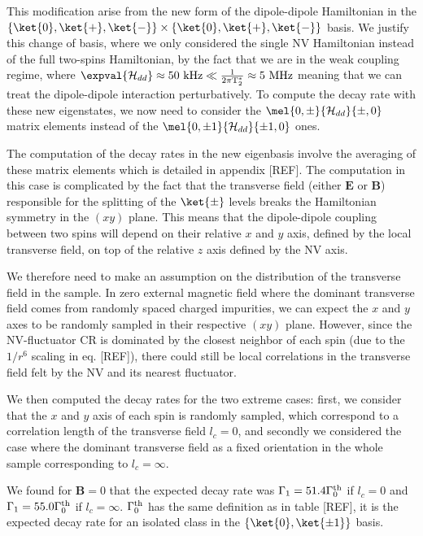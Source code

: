 \documentclass[a4paper,11pt]{report}
\begin{document}
This modification arise from the new form of the dipole-dipole Hamiltonian in the $\{ \ket{0}, \ket{+}, \ket{-} \} \times \{ \ket{0}, \ket{+}, \ket{-} \}$ basis. We justify this change of basis, where we only considered the single NV Hamiltonian instead of the full two-spins Hamiltonian, by the fact that we are in the weak coupling regime, where $\expval{\mathcal{H}_{dd}} \approx 50\ \rm kHz \ll \frac{1}{2\pi T_2^*} \approx 5\ \rm MHz$ meaning that we can treat the dipole-dipole interaction perturbatively. To compute the decay rate with these new eigenstates, we now need to consider the $\mel{0,\pm}{\mathcal{H}_{dd}}{\pm ,0}$ matrix elements instead of the $\mel{0,\pm 1}{\mathcal{H}_{dd}}{\pm 1,0}$ ones.

The computation of the decay rates in the new eigenbasis involve the averaging of these matrix elements which is detailed in appendix [REF]. The computation in this case is complicated by the fact that the transverse field (either $\mathbf{E}$ or $\mathbf{B}$) responsible for the splitting of the $\ket{\pm}$ levels breaks the Hamiltonian symmetry in the $(xy)$ plane. This means that the dipole-dipole coupling between two spins will depend on their relative $x$ and $y$ axis, defined by the local transverse field, on top of the relative $z$ axis defined by the NV axis. 

We therefore need to make an assumption on the distribution of the transverse field in the sample. In zero external magnetic field where the dominant transverse field comes from randomly spaced charged impurities, we can expect the $x$ and $y$ axes to be randomly sampled in their respective $(xy)$ plane. However, since the NV-fluctuator CR is dominated by the closest neighbor of each spin (due to the $1/r^6$ scaling in eq. [REF]), there could still be local correlations in the transverse field felt by the NV and its nearest fluctuator.

We then computed the decay rates for the two extreme cases: first, we consider that the $x$ and $y$ axis of each spin is randomly sampled, which correspond to a correlation length of the transverse field $l_c=0$, and secondly we considered the case where the dominant transverse field as a fixed orientation in the whole sample corresponding to $l_c=\infty$.

We found for $\mathbf{B}=0$ that the expected decay rate was $\Gamma_1=51.4 \Gamma_0^{\rm th}$ if $l_c=0$ and $\Gamma_1=55.0 \Gamma_0^{\rm th}$ if $l_c=\infty$. $\Gamma_0^{\rm th}$ has the same definition as in table [REF], it is the expected decay rate for an isolated class in the $\{ \ket{0}, \ket{\pm 1} \}$ basis.
\end{document}
